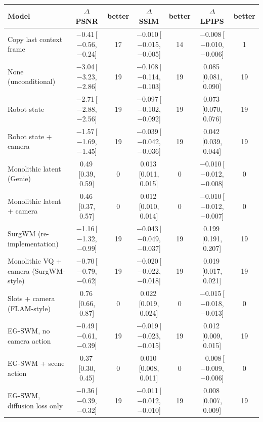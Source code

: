 \begin{tabular}{lcccccc}
\toprule
Model & $\Delta$PSNR & better & $\Delta$SSIM & better & $\Delta$LPIPS & better \\
\midrule
Copy last context frame & $-$0.41\,{\scriptsize[$-$0.56, $-$0.24]} & 17 & $-$0.010\,{\scriptsize[$-$0.015, $-$0.005]} & 14 & $-$0.008\,{\scriptsize[$-$0.010, $-$0.006]} & 1 \\
None (unconditional) & $-$3.04\,{\scriptsize[$-$3.23, $-$2.86]} & 19 & $-$0.108\,{\scriptsize[$-$0.114, $-$0.103]} & 19 & 0.085\,{\scriptsize[0.081, 0.090]} & 19 \\
Robot state & $-$2.71\,{\scriptsize[$-$2.88, $-$2.56]} & 19 & $-$0.097\,{\scriptsize[$-$0.102, $-$0.092]} & 19 & 0.073\,{\scriptsize[0.070, 0.076]} & 19 \\
Robot state + camera & $-$1.57\,{\scriptsize[$-$1.69, $-$1.45]} & 19 & $-$0.039\,{\scriptsize[$-$0.042, $-$0.036]} & 19 & 0.042\,{\scriptsize[0.039, 0.044]} & 19 \\
Monolithic latent (Genie) & 0.49\,{\scriptsize[0.39, 0.59]} & 0 & 0.013\,{\scriptsize[0.011, 0.015]} & 0 & $-$0.010\,{\scriptsize[$-$0.012, $-$0.008]} & 0 \\
Monolithic latent + camera & 0.46\,{\scriptsize[0.37, 0.57]} & 0 & 0.012\,{\scriptsize[0.010, 0.014]} & 0 & $-$0.010\,{\scriptsize[$-$0.012, $-$0.007]} & 0 \\
SurgWM (re-implementation) & $-$1.16\,{\scriptsize[$-$1.32, $-$0.99]} & 19 & $-$0.043\,{\scriptsize[$-$0.049, $-$0.037]} & 19 & 0.199\,{\scriptsize[0.191, 0.207]} & 19 \\
Monolithic VQ + camera (SurgWM-style) & $-$0.70\,{\scriptsize[$-$0.79, $-$0.62]} & 19 & $-$0.020\,{\scriptsize[$-$0.022, $-$0.018]} & 19 & 0.019\,{\scriptsize[0.017, 0.021]} & 19 \\
Slots + camera (FLAM-style) & 0.76\,{\scriptsize[0.66, 0.87]} & 0 & 0.022\,{\scriptsize[0.019, 0.024]} & 0 & $-$0.015\,{\scriptsize[$-$0.018, $-$0.013]} & 0 \\
EG-SWM, no camera action & $-$0.49\,{\scriptsize[$-$0.61, $-$0.39]} & 19 & $-$0.019\,{\scriptsize[$-$0.023, $-$0.015]} & 19 & 0.012\,{\scriptsize[0.009, 0.015]} & 19 \\
EG-SWM + scene action & 0.37\,{\scriptsize[0.30, 0.45]} & 0 & 0.010\,{\scriptsize[0.008, 0.011]} & 0 & $-$0.008\,{\scriptsize[$-$0.009, $-$0.006]} & 0 \\
EG-SWM, diffusion loss only & $-$0.36\,{\scriptsize[$-$0.39, $-$0.32]} & 19 & $-$0.011\,{\scriptsize[$-$0.012, $-$0.010]} & 19 & 0.008\,{\scriptsize[0.007, 0.009]} & 19 \\

\end{tabular}
